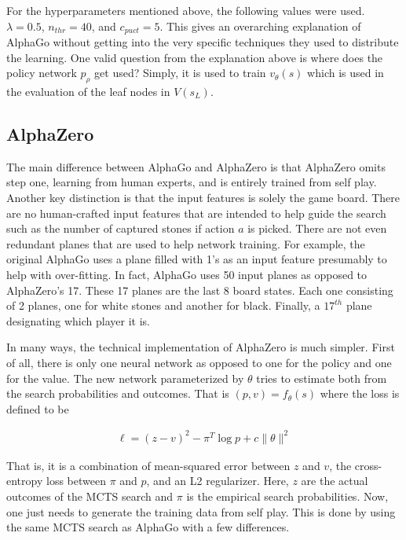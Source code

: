 \documentclass{article}
\begin{document}
  For the hyperparameters mentioned above, the following values were used. $\lambda =0.5$, $n_{thr} = 40$, and $c_{puct} = 5$. This gives an overarching explanation of AlphaGo without getting into the very specific techniques they used to distribute the learning. One valid question from the explanation above is where does the policy network $p_\rho$ get used? Simply, it is used to train $v_{\theta}(s)$ which is used in the evaluation of the leaf nodes in $V(s_L)$.

  \subsection{AlphaZero}

  The main difference between AlphaGo and AlphaZero is that AlphaZero omits step one, learning from human experts, and is entirely trained from self play. Another key distinction is that the input features is solely the game board. There are no human-crafted input features that are intended to help guide the search such as the number of captured stones if action $a$ is picked. There are not even redundant planes that are used to help network training. For example, the original AlphaGo uses a plane filled with 1's as an input feature presumably to help with over-fitting. In fact, AlphaGo uses 50 input planes as opposed to AlphaZero's 17. These 17 planes are the last 8 board states. Each one consisting of 2 planes, one for white stones and another for black. Finally, a $17^{th}$ plane designating which player it is.

  In many ways, the technical implementation of AlphaZero is much simpler. First of all, there is only one neural network as opposed to one for the policy and one for the value. The new network parameterized by $\theta$ tries to estimate both from the search probabilities and outcomes. That is $(p, v) = f_{\theta}(s)$ where the loss is defined to be

  \begin{gather*}
    \ell = (z-v)^2 - \pi^T \log p + c \lVert \theta \rVert^2
  \end{gather*}

  That is, it is a combination of mean-squared error between $z$ and $v$, the cross-entropy loss between $\pi$ and $p$, and an L2 regularizer. Here, $z$ are the actual outcomes of the MCTS search and $\pi$ is the empirical search probabilities. Now, one just needs to generate the training data from self play. This is done by using the same MCTS search as AlphaGo with a few differences.
\end{document}
